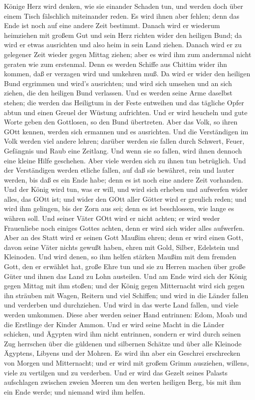 Könige Herz wird denken, wie sie einander Schaden tun, und werden doch
über einem Tisch fälschlich miteinander reden. Es wird ihnen aber
fehlen; denn das Ende ist noch auf eine andere Zeit bestimmt.
 Danach wird er wiederum heimziehen mit großem Gut und sein
Herz richten wider den heiligen Bund; da wird er etwas ausrichten und
also heim in sein Land ziehen.  Danach wird er zu gelegener
Zeit wieder gegen Mittag ziehen; aber es wird ihm zum andernmal nicht
geraten wie zum erstenmal.  Denn es werden Schiffe aus
Chittim wider ihn kommen, daß er verzagen wird und umkehren muß. Da wird
er wider den heiligen Bund ergrimmen und wird's ausrichten; und wird
sich umsehen und an sich ziehen, die den heiligen Bund verlassen.
 Und es werden seine Arme daselbst stehen; die werden das
Heiligtum in der Feste entweihen und das tägliche Opfer abtun und einen
Greuel der Wüstung aufrichten.  Und er wird heucheln und
gute Worte geben den Gottlosen, so den Bund übertreten. Aber das Volk,
so ihren GOtt kennen, werden sich ermannen und es ausrichten.
 Und die Verständigen im Volk werden viel andere lehren;
darüber werden sie fallen durch Schwert, Feuer, Gefängnis und Raub eine
Zeitlang.  Und wenn sie so fallen, wird ihnen dennoch eine
kleine Hilfe geschehen. Aber viele werden sich zu ihnen tun betrüglich.
 Und der Verständigen werden etliche fallen, auf daß sie
bewähret, rein und lauter werden, bis daß es ein Ende habe; denn es ist
noch eine andere Zeit vorhanden.  Und der König wird tun,
was er will, und wird sich erheben und aufwerfen wider alles, das GOtt
ist; und wider den GOtt aller Götter wird er greulich reden; und wird
ihm gelingen, bis der Zorn aus sei; denn es ist beschlossen, wie lange
es währen soll.  Und seiner Väter GOtt wird er nicht
achten; er wird weder Frauenliebe noch einiges Gottes achten, denn er
wird sich wider alles aufwerfen.  Aber an des Statt wird er
seinen Gott Maußim ehren; denn er wird einen Gott, davon seine Väter
nichts gewußt haben, ehren mit Gold, Silber, Edelstein und Kleinoden.
 Und wird denen, so ihm helfen stärken Maußim mit dem
fremden Gott, den er erwählet hat, große Ehre tun und sie zu Herren
machen über große Güter und ihnen das Land zu Lohn austeilen.
 Und am Ende wird sich der König gegen Mittag mit ihm
stoßen; und der König gegen Mitternacht wird sich gegen ihn sträuben mit
Wagen, Reitern und viel Schiffen; und wird in die Länder fallen und
verderben und durchziehen.  Und wird in das werte Land
fallen, und viele werden umkommen. Diese aber werden seiner Hand
entrinnen: Edom, Moab und die Erstlinge der Kinder Ammon. 
Und er wird seine Macht in die Länder schicken, und Ägypten wird ihm
nicht entrinnen,  sondern er wird durch seinen Zug
herrschen über die güldenen und silbernen Schätze und über alle Kleinode
Ägyptens, Libyens und der Mohren.  Es wird ihn aber ein
Geschrei erschrecken von Morgen und Mitternacht; und er wird mit großem
Grimm ausziehen, willens, viele zu vertilgen und zu verderben.
 Und er wird das Gezelt seines Palasts aufschlagen zwischen
zweien Meeren um den werten heiligen Berg, bis mit ihm ein Ende werde;
und niemand wird ihm helfen.

